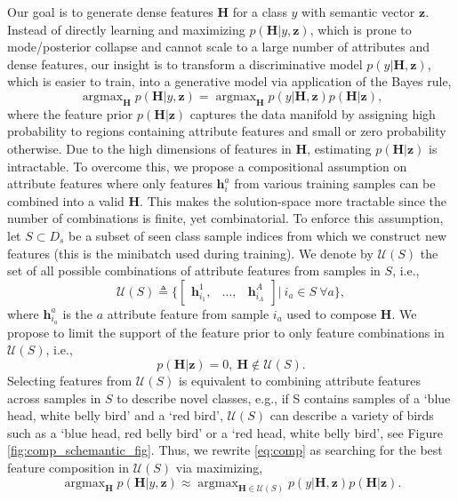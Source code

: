 \documentclass[10pt,journal,compsoc]{IEEEtran}
\newcommand{\z}{\boldsymbol{z}}
\newcommand{\h}{\boldsymbol{h}}
\renewcommand{\H}{\boldsymbol{H}}
\newcommand{\1}{\boldsymbol{1}}
\newcommand{\0}{\boldsymbol{0}}
\newcommand{\U}{\mathcal{U}}
\newcommand{\argmax}{\operatorname{argmax}}
\newcommand{\<}{\langle}
\renewcommand{\>}{\rangle}
\begin{document}
Our goal is to generate dense features $\H$ for a class $y$ with semantic vector $\z$. Instead of directly learning and maximizing $p(\H | y, \z)$, which is prone to mode/posterior collapse and cannot scale to a large number of attributes and dense features, our insight is to transform a discriminative model $p(y | \H, \z)$, which is easier to train, into a generative model via application of the Bayes rule,
\begin{equation}
\label{eq:comp}
\argmax_{\H}p(\H|y, \z) =\argmax_{\H}p(y|\H, \z)p(\H | \z),
\end{equation}
where the feature prior $p(\H|\z)$ captures the data manifold by assigning high probability to regions containing attribute features and small or zero probability otherwise. Due to the high dimensions of features in $\H$, estimating $p(\H|\z)$ is intractable. To overcome this, we propose a compositional assumption on attribute features where only features $\h_i^a$ from various training samples can be combined into a valid $\H$. This makes the solution-space more tractable since the number of combinations is finite, yet combinatorial. To enforce this assumption, let $S\subset D_s$ be a subset of seen class sample indices from which we construct new features (this is the minibatch used during training). We denote by $\U(S)$ the set of all possible combinations of attribute features from samples in $S$, i.e., 
\begin{equation}
\U(S) \triangleq \big\{ \begin{bmatrix} \h^1_{i_1}, \!&\!\!\ldots ,\!\!&\! \h^A_{i_A} \end{bmatrix} |\ i_a \in S \ \forall a\big\},
\end{equation}
where $\h^a_{i_a}$ is the $a$ attribute feature from sample $i_a$ used to compose $\H$.
We propose to limit the support of the feature prior to only feature combinations in $\U(S)$, i.e., 
\begin{equation}
p(\H|\z) = 0,\ \H \not\in \U(S).
\end{equation}
Selecting features from $\U(S)$ is equivalent to combining attribute features across samples in $S$ to describe novel classes, e.g., if S contains samples of a `blue head, white belly bird' and a `red bird', $\U(S)$ can describe a variety of birds such as a `blue head, red belly bird' or a `red head, white belly bird', see Figure \ref{fig:comp_schemantic_fig}. Thus, we rewrite \eqref{eq:comp} as searching for the best feature composition in $\U(S)$ via maximizing,
\begin{equation}
 \argmax_{\H}p(\H|y,\z) \approx \argmax_{\H\in \U(S)}p(y|\H,\z)p(\H|\z).
\label{eq:compose}
\end{equation}
\end{document}
